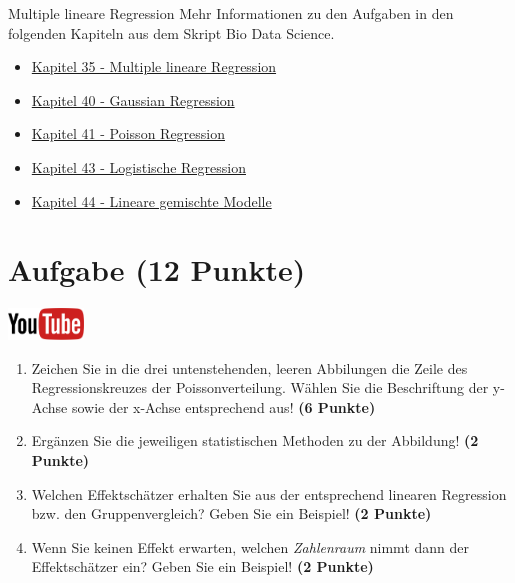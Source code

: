 \documentclass[a4paper, 10pt]{scrartcl}\usepackage[]{graphicx}\usepackage[]{xcolor}
\begin{document}
\clearpage
\begin{graybox}{Multiple lineare Regression}
Mehr Informationen zu den Aufgaben in den folgenden Kapiteln aus dem Skript Bio Data Science.
  \begin{itemize}
  \item \href{https://jkruppa.github.io/stat-modeling-basic.html}{Kapitel 35 - Multiple lineare Regression}
  \item \href{https://jkruppa.github.io/stat-modeling-gaussian.html}{Kapitel 40 - Gaussian Regression}
  \item \href{https://jkruppa.github.io/stat-modeling-poisson.html}{Kapitel 41 - Poisson Regression}
  \item \href{https://jkruppa.github.io/stat-modeling-logistic.html}{Kapitel 43 - Logistische Regression}
  \item \href{https://jkruppa.github.io/stat-modeling-mixed.html}{Kapitel 44 - Lineare gemischte Modelle}
  \end{itemize}
\end{graybox}
\clearpage

\section{Aufgabe \hfill (12 Punkte)}

\hfill\href{https://youtu.be/lHzRgm7hPw0}{\includegraphics[width =
  2cm]{img/youtube}}\\[1Ex]



\begin{enumerate}
\item Zeichen Sie in die drei untenstehenden, leeren Abbilungen die Zeile des
  Regressionskreuzes der Poissonverteilung. W{\"a}hlen Sie die Beschriftung der
  y-Achse sowie der x-Achse entsprechend aus! \textbf{(6 Punkte)}
\item Erg{\"a}nzen Sie die jeweiligen statistischen Methoden zu der Abbildung! \textbf{(2 Punkte)}
\item Welchen Effektsch{\"a}tzer erhalten Sie aus der entsprechend linearen
  Regression bzw. den Gruppenvergleich? Geben Sie ein Beispiel! \textbf{(2 Punkte)}
\item Wenn Sie keinen Effekt erwarten, welchen \textit{Zahlenraum} nimmt dann
  der Effektsch{\"a}tzer ein? Geben Sie ein Beispiel! \textbf{(2 Punkte)}
\end{enumerate}
\end{document}

